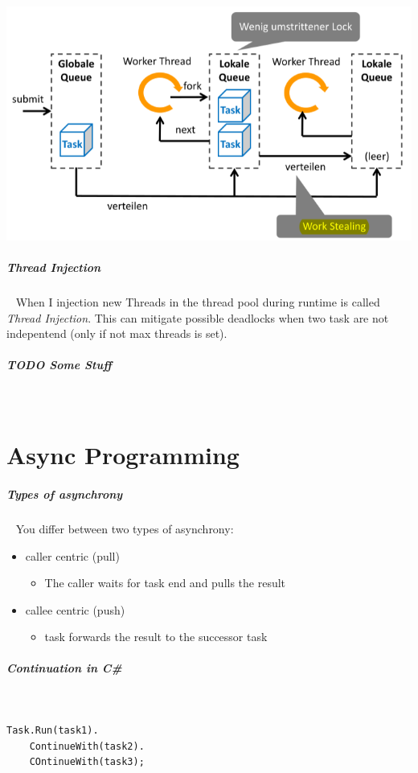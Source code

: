 \documentclass[11pt,twoside,landscape]{article}
\begin{document}
\begin{multicols}{3}
{{{
\begin{center}
\includegraphics[width=.9\linewidth]{img/work_stealing_thread_pool.png}
\end{center}
\label{fig:work-stealing-thread-pool}
}
\subparagraph{Thread Injection} \
\label{sec:orgbe6b18d}
When I injection new Threads in the thread pool during runtime is called \emph{Thread Injection}.
This can mitigate possible deadlocks when two task are not indepentend (only if not max threads is set).

\subparagraph{{\bfseries\sffamily TODO} Some Stuff} \
\label{sec:orgc22087a}
\section{Async Programming}
\label{sec:orgf32871e}
\subparagraph{Types of asynchrony} \
\label{sec:orgac3006c}
You differ between two types of asynchrony:
\begin{itemize}
\item caller centric (pull)
\begin{itemize}
\item The caller waits for task end and pulls the result
\end{itemize}
\item callee centric (push)
\begin{itemize}
\item task forwards the result to the successor task
\end{itemize}
\end{itemize}

\subparagraph{Continuation in C\#} \
\label{sec:org417d051}

\lstset{language=csharp,label= ,caption= ,captionpos=b,numbers=none}
\begin{lstlisting}
Task.Run(task1).
    ContinueWith(task2).
    COntinueWith(task3);
\end{lstlisting}

}}
\end{multicols}
\end{document}
